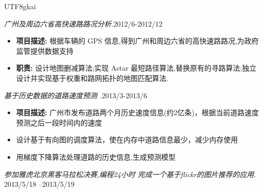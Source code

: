 \documentclass[9pt]{article}
\newenvironment{changemargin}[2]{%
  \begin{list}{}{%
    \setlength{\topsep}{0pt}%
    \setlength{\leftmargin}{#1}%
    \setlength{\rightmargin}{#2}%
    \setlength{\listparindent}{\parindent}%
    \setlength{\itemindent}{\parindent}%
    \setlength{\parsep}{\parskip}%
  }%
  \item[]}{\end{list}
}
\newenvironment{body} {
	\vspace*{-16pt}
	\begin{changemargin}{-0.25in}{-0.5in}
  }	
	{\end{changemargin}
}
\begin{document}
\begin{CJK}{UTF8}{gkai}
\begin{body}

	\emph{广州及周边六省高快速路路况分析.}\hfill  {2012/6-2012/12}\\
	\vspace*{-4pt}
	\begin{itemize} \itemsep -0pt  %
		\item{\textbf{项目描述:}}{}  根据车辆的 GPS 信息,得到广州和周边六省的高快速路路况,为政府监管提供数据支持
		\item {\textbf{职责:}}{}  设计地图删减算法;实现 Astar 最短路径算法,替换原有的寻路算法;独立设计并实现基于权重和路网拓扑的地图匹配算法.

	\end{itemize}



	
	\emph{基于历史数据的道路速度预测 .}\hfill  2013/3-2013/6\\
	\vspace*{-4pt}
	\begin{itemize} \itemsep -0pt  %
		\item{\textbf{项目描述:}}{}  广州市发布道路两个月历史速度信息(约2亿条)，根据当前道路速度预测之后一段时间内的速度
		\item 设计基于有向图的调度算法，使在内存中道路信息最少，减少内存使用
		\item 用梯度下降算法处理道路的历史信息,生成预测模型
	\end{itemize}


 	\emph{参加雅虎北京黑客马拉松决赛,编程24小时 完成一个基于flickr的图片推荐的应用.} \hfill {2013/5/18 –2013/5/19}\\
	\vspace*{4pt}

% 	


\end{body}
\end{CJK}
\end{document}
